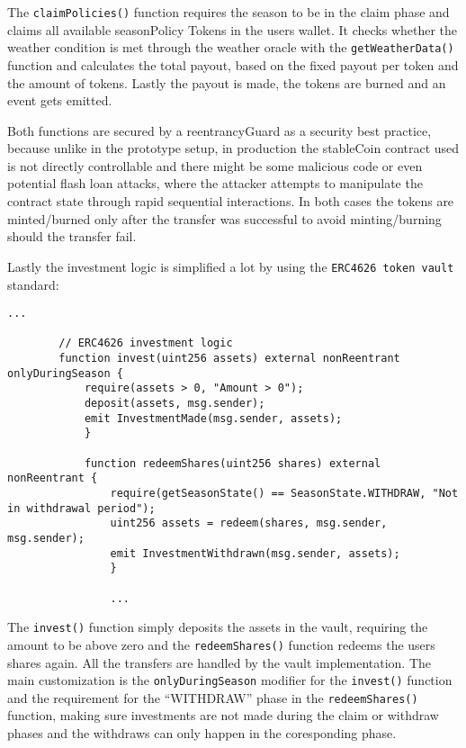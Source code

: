\documentclass[11pt,a4paper]{article}
\begin{document}
		The \texttt{claimPolicies()} function requires the season to be in the claim phase and claims all available seasonPolicy Tokens in the users wallet.
		It checks whether the weather condition is met through the weather oracle with the \texttt{getWeatherData()} function and calculates the total payout, based on the fixed payout per token and the amount of tokens.
		Lastly the payout is made, the tokens are burned and an event gets emitted.

		Both functions are secured by a reentrancyGuard as a security best practice, because unlike in the prototype setup, in production the stableCoin contract used is not directly controllable and there might be some malicious code or even potential flash loan attacks, where the attacker attempts to manipulate the contract state through rapid sequential interactions.
		In both cases the tokens are minted/burned only after the transfer was successful to avoid minting/burning should the transfer fail.

		Lastly the investment logic is simplified a lot by using the \texttt{ERC4626 token vault} standard:

		\begin{lstlisting}[style=soliditystyle, caption={RainyDayFund.sol - Main Insurance Contract},label={lst:lstlisting4}]
		...

		// ERC4626 investment logic
		function invest(uint256 assets) external nonReentrant onlyDuringSeason {
			require(assets > 0, "Amount > 0");
			deposit(assets, msg.sender);
			emit InvestmentMade(msg.sender, assets);
			}

			function redeemShares(uint256 shares) external nonReentrant {
				require(getSeasonState() == SeasonState.WITHDRAW, "Not in withdrawal period");
				uint256 assets = redeem(shares, msg.sender, msg.sender);
				emit InvestmentWithdrawn(msg.sender, assets);
				}

				...
		\end{lstlisting}

		The \texttt{invest()} function simply deposits the assets in the vault, requiring the amount to be above zero and the \texttt{redeemShares()} function redeems the users shares again.
		All the transfers are handled by the vault implementation.
		The main customization is the \texttt{onlyDuringSeason} modifier for the \texttt{invest()} function and the requirement for the \enquote{WITHDRAW} phase in the \texttt{redeemShares()} function, making sure investments are not made during the claim or withdraw phases and the withdraws can only happen in the coresponding phase.
\end{document}
